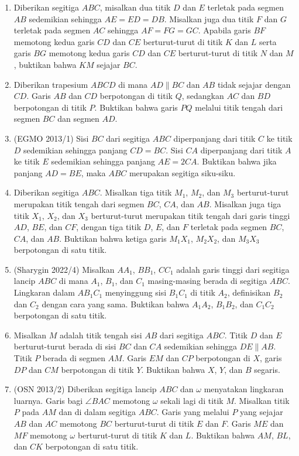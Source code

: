 \documentclass[12pt]{scrartcl}
\begin{document}
\begin{enumerate}
\item Diberikan segitiga $ABC$, misalkan dua titik $D$ dan $E$ terletak pada segmen $AB$ sedemikian sehingga $AE=ED=DB$. Misalkan juga dua titik $F$ dan $G$ terletak pada segmen $AC$ sehingga $AF=FG=GC$. Apabila garis $BF$ memotong kedua garis $CD$ dan $CE$ berturut-turut di titik $K$ dan $L$ serta garis $BG$ memotong kedua garis $CD$ dan $CE$ berturut-turut di titik $N$ dan $M$, buktikan bahwa $KM$ sejajar $BC$.
\item Diberikan trapesium $ABCD$ di mana $AD\parallel BC$ dan $AB$ tidak sejajar dengan $CD$. Garis $AB$ dan $CD$ berpotongan di titik $Q$, sedangkan $AC$ dan $BD$ berpotongan di titik $P$. Buktikan bahwa garis $PQ$ melalui titik tengah dari segmen $BC$ dan segmen $AD$.
\item (EGMO 2013/1) Sisi $BC$ dari segitiga $ABC$ diperpanjang dari titik $C$ ke titik $D$ sedemikian sehingga panjang $CD=BC$. Sisi $CA$ diperpanjang dari titik $A$ ke titik $E$ sedemikian sehingga panjang $AE=2CA$. Buktikan bahwa jika panjang $AD=BE$, maka $ABC$ merupakan segitiga siku-siku.
\item Diberikan segitiga $ABC$. Misalkan tiga titik $M_1$, $M_2$, dan $M_3$ berturut-turut merupakan titik tengah dari segmen $BC$, $CA$, dan $AB$. Misalkan juga tiga titik $X_1$, $X_2$, dan $X_3$ berturut-turut merupakan titik tengah dari garis tinggi $AD$, $BE$, dan $CF$, dengan tiga titik $D$, $E$, dan $F$ terletak pada segmen $BC$, $CA$, dan $AB$. Buktikan bahwa ketiga garis $M_1X_1$, $M_2X_2$, dan $M_3X_3$ berpotongan di satu titik.
\item (Sharygin 2022/4) Misalkan $AA_1$, $BB_1$, $CC_1$ adalah garis tinggi dari segitiga lancip $ABC$ di mana $A_1$, $B_1$, dan $C_1$ masing-masing berada di segitiga $ABC$. Lingkaran dalam $AB_1C_1$ menyinggung sisi $B_1C_1$ di titik $A_2$, definisikan $B_2$ dan $C_2$ dengan cara yang sama. Buktikan bahwa $A_1A_2$, $B_1B_2$, dan $C_1C_2$ berpotongan di satu titik.
\item Misalkan $M$ adalah titik tengah sisi $AB$ dari segitiga $ABC$. Titik $D$ dan $E$ berturut-turut berada di sisi $BC$ dan $CA$ sedemikian sehingga $DE\parallel AB$. Titik $P$ berada di segmen $AM$. Garis $EM$ dan $CP$ berpotongan di $X$, garis $DP$ dan $CM$ berpotongan di titik $Y$. Buktikan bahwa $X$, $Y$, dan $B$ segaris.
\item (OSN 2013/2) Diberikan segitiga lancip $ABC$ dan $\omega$ menyatakan lingkaran luarnya. Garis bagi $\angle BAC$ memotong $\omega$ sekali lagi di titik $M$. Misalkan titik $P$ pada $AM$ dan di dalam segitiga $ABC$. Garis yang melalui $P$ yang sejajar $AB$ dan $AC$ memotong $BC$ berturut-turut di titik $E$ dan $F$. Garis $ME$ dan $MF$ memotong $\omega$ berturut-turut di titik $K$ dan $L$. Buktikan bahwa $AM$, $BL$, dan $CK$ berpotongan di satu titik.

\end{enumerate}
\end{document}
